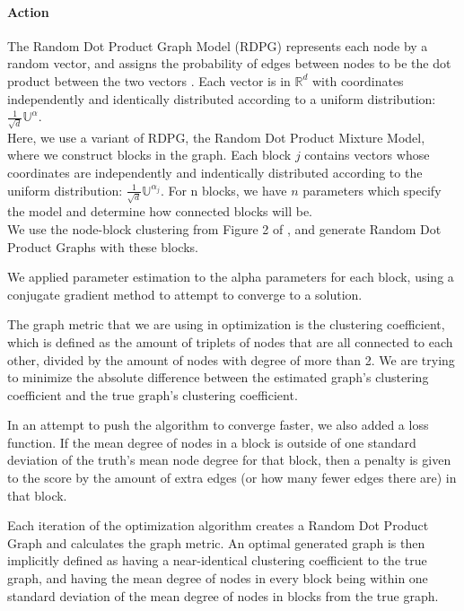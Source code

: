 \documentclass[12pt]{article}
\begin{document}
\paragraph{Action}
The Random Dot Product Graph Model (RDPG) represents each node by a random
vector, and assigns the probability of edges between nodes to be the dot product
between the two vectors \cite{young}.
Each vector is in $\mathbb{R}^{d}$ with coordinates independently and
identically distributed according to a uniform distribution:
$\frac{1}{\sqrt{d}}\mathbb{U}^{\alpha}$.\\

Here, we use a variant of RDPG, the Random Dot Product Mixture Model, where we
construct blocks in the graph.  Each block $j$ contains vectors whose 
coordinates are independently and indentically distributed according to the
uniform distribution: $\frac{1}{\sqrt{d}}\mathbb{U}^{\alpha_{j}}$.  For n
blocks, we have $n$ parameters which specify the model and determine how
connected blocks will be.\\

We use the node-block clustering from Figure 2 of \cite{pavlovic}, and generate
Random Dot Product Graphs with these blocks.

We applied parameter estimation to the alpha parameters for each block, using a
conjugate gradient method to attempt to converge to a solution.

The graph metric that we are using in optimization is the clustering 
coefficient, which is defined \cite{pavlovic} as the amount of triplets of nodes
that are all connected to each other, divided by the amount of nodes with degree
of more  than 2.  We are trying to minimize the absolute difference between the 
estimated graph's clustering coefficient and the true graph's clustering 
coefficient.

In an attempt to push the algorithm to converge faster, we also added a loss
function.  If the mean degree of nodes in a block is outside of one standard
deviation of the truth's mean node degree for that block, then a penalty is
given to the score by the amount of extra edges (or how many fewer edges there
are) in that block.

Each iteration of the optimization algorithm creates a Random Dot Product Graph
and calculates the graph metric.  An optimal generated graph is then implicitly 
defined as having a near-identical clustering coefficient to the true graph, and
having the mean degree of nodes in every block being within one standard
deviation of the mean degree of nodes in blocks from the true graph.
\end{document}
